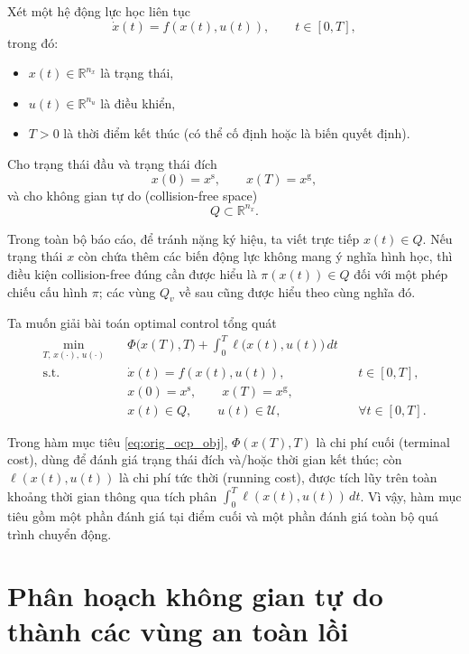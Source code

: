 \documentclass[12pt]{article}
\begin{document}
Xét một hệ động lực học liên tục
\begin{equation}
\dot x(t)=f(x(t),u(t)),
\qquad t\in[0,T],
\label{eq:ct_dyn}
\end{equation}
trong đó:
\begin{itemize}
    \item $x(t)\in\mathbb R^{n_x}$ là trạng thái,
    \item $u(t)\in\mathbb R^{n_u}$ là điều khiển,
    \item $T>0$ là thời điểm kết thúc (có thể cố định hoặc là biến quyết định).
\end{itemize}

Cho trạng thái đầu và trạng thái đích
\[
x(0)=x^{\mathrm s},
\qquad
x(T)=x^{\mathrm g},
\]
và cho không gian tự do (collision-free space)
\[
Q \subset \mathbb R^{n_x}.
\]

Trong toàn bộ báo cáo, để tránh nặng ký hiệu, ta viết trực tiếp $x(t)\in Q$. Nếu trạng thái $x$ còn chứa thêm các biến động lực không mang ý nghĩa hình học, thì điều kiện collision-free đúng cần được hiểu là $\pi(x(t))\in Q$ đối với một phép chiếu cấu hình $\pi$; các vùng $Q_v$ về sau cũng được hiểu theo cùng nghĩa đó.

Ta muốn giải bài toán optimal control tổng quát
\begin{align}
\min_{T,\,x(\cdot),\,u(\cdot)}\quad
& \Phi\bigl(x(T),T\bigr)+\int_0^T \ell\bigl(x(t),u(t)\bigr)\,dt
\label{eq:orig_ocp_obj}\\
\text{s.t.}\quad
& \dot x(t)=f(x(t),u(t)), && t\in[0,T],
\label{eq:orig_ocp_dyn}\\
& x(0)=x^{\mathrm s},\qquad x(T)=x^{\mathrm g},
\label{eq:orig_ocp_bc}\\
& x(t)\in Q,\qquad u(t)\in \mathcal U, && \forall t\in[0,T].
\label{eq:orig_ocp_path}
\end{align}


Trong hàm mục tiêu \eqref{eq:orig_ocp_obj}, 
$\Phi(x(T),T)$ là chi phí cuối (terminal cost), dùng để đánh giá trạng thái đích và/hoặc thời gian kết thúc; 
còn $\ell(x(t),u(t))$ là chi phí tức thời (running cost), được tích lũy trên toàn khoảng thời gian thông qua tích phân 
$\int_0^T \ell(x(t),u(t))\,dt$. 
Vì vậy, hàm mục tiêu gồm một phần đánh giá tại điểm cuối và một phần đánh giá toàn bộ quá trình chuyển động.

\section{Phân hoạch không gian tự do thành các vùng an toàn lồi}
\end{document}
